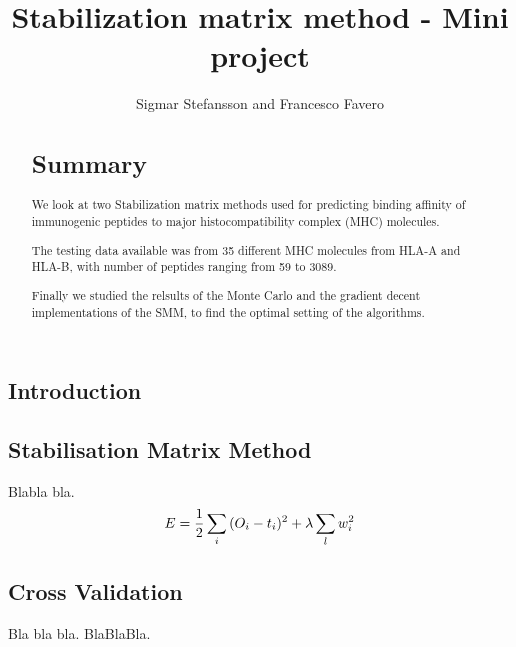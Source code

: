 \documentclass{bioinfo}
\begin{document}
\begin{application}

\title[SMM Project]{Stabilization matrix method - Mini project}
\author[Sigmar Stefansson, Francesco Favero]{Sigmar Stefansson and Francesco Favero}
\address{Danmarks Tekniske Univeristet}



\maketitle

\begin{abstract}

\section{Summary}
We look at two Stabilization matrix methods \cite{SMM} used for predicting binding affinity of immunogenic peptides to major histocompatibility complex \cite{wiki:MHC} (MHC) molecules.
\par The testing data available was from 35 different MHC molecules from HLA-A and HLA-B, with number of peptides ranging from 59 to 3089.
\par Finally we studied the relsults of the Monte Carlo and the gradient decent implementations of the SMM, to find the optimal setting of the algorithms.

\end{abstract}

\section*{Introduction}

\subsection*{Stabilisation Matrix Method}
Blabla bla.
\begin{equation}
\label{eq:general}
E = \frac{1}{2} \sum_i{(O_i-t_i)^2} + \lambda \sum_l{w_i^2} \\
\end{equation}

\subsection*{Cross Validation}
Bla bla bla. BlaBlaBla.


\end{application}
\end{document}
